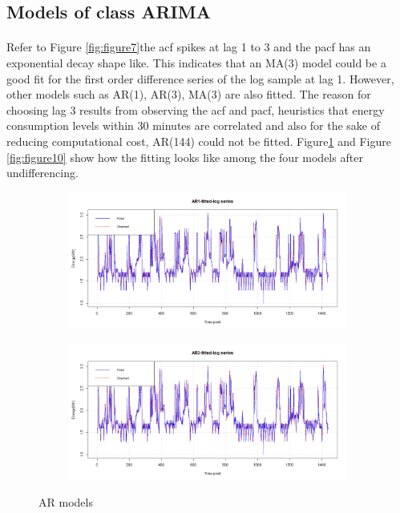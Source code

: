 \documentclass[12pt]{article}
\begin{document}
\subsection{Models of class ARIMA}
\paragraph{}
Refer to Figure \ref{fig:figure7}the acf spikes at lag 1 to 3 and the pacf has an exponential decay shape like. This indicates that an MA(3) model could be a good fit for the first order difference series of the log sample at lag 1. However, other models such as AR(1), AR(3), MA(3) are also fitted. The reason for choosing lag 3 results from observing the acf and pacf, heuristics that energy consumption levels within 30 minutes are correlated and also for the sake of reducing computational cost, AR(144) could not be fitted. Figure\ref{fig:figure9}  and Figure \ref{fig:figure10}  show how the fitting looks like among the four models after undifferencing.
\begin{figure}[H]
  \centering
  \begin{subfigure}[b]{0.9\linewidth}
    \includegraphics[width=\linewidth]{figure9-1.png}
  \end{subfigure}
  \begin{subfigure}[b]{0.9\linewidth}
    \includegraphics[width=\linewidth]{figure9-2.png}
  \end{subfigure}
  \caption{AR models}
  \label{fig:figure9}
\end{figure}
\end{document}
